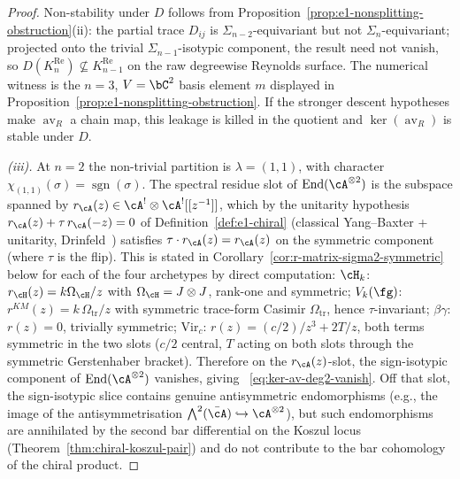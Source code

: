 \begin{proof}
Non-stability under $D$ follows from
Proposition~\ref{prop:e1-nonsplitting-obstruction}(ii): the partial
trace $D_{ij}$ is $\Sigma_{n-2}$-equivariant but not
$\Sigma_n$-equivariant; projected onto the trivial
$\Sigma_{n-1}$-isotypic component, the result need not vanish, so
\(D(K^{\mathrm{Re}}_n)\not\subseteq K^{\mathrm{Re}}_{n-1}\) on the
raw degreewise Reynolds surface. The numerical witness is the
$n=3$, $V=\bC^2$ basis element $m$ displayed in
Proposition~\ref{prop:e1-nonsplitting-obstruction}. If the
stronger descent hypotheses make \(\operatorname{av}_R\) a chain map,
this leakage is killed in the quotient and
\(\ker(\operatorname{av}_R)\) is stable under \(D\).

\emph{(iii).} At $n=2$ the non-trivial partition is $\lambda=(1,1)$,
with character $\chi_{(1,1)}(\sigma)=\operatorname{sgn}(\sigma)$.
The spectral residue slot of $\operatorname{End}(\cA^{\otimes 2})$
is the subspace spanned by $r_\cA(z)\in\cA^{!}\otimes\cA^{!}[[z^{-1}]]$,
which by the unitarity hypothesis
$r_\cA(z)+\tau\,r_\cA(-z)=0$ of
Definition~\textup{\ref{def:e1-chiral}} (classical
Yang--Baxter + unitarity, Drinfeld~\cite{Drinfeld90}) satisfies
$\tau\cdot r_\cA(z)=r_\cA(z)$ on the symmetric component (where
$\tau$ is the flip). This is stated in
Corollary~\ref{cor:r-matrix-sigma2-symmetric} below for each of
the four archetypes by direct computation:
$\cH_k$: $r_{\cH}(z)=k\Omega_{\cH}/z$ with
$\Omega_{\cH}=J\otimes J$, rank-one and symmetric;
$V_k(\fg)$: $r^{KM}(z)=k\,\Omega_{\mathrm{tr}}/z$ with symmetric
trace-form Casimir $\Omega_{\mathrm{tr}}$, hence $\tau$-invariant;
$\beta\gamma$: $r(z)=0$, trivially symmetric;
$\mathrm{Vir}_c$: $r(z)=(c/2)/z^3+2T/z$, both terms symmetric in the
two slots ($c/2$ central, $T$ acting on both slots through the
symmetric Gerstenhaber bracket). Therefore on the
$r_\cA(z)$-slot, the sign-isotypic component of
$\operatorname{End}(\cA^{\otimes 2})$ vanishes, giving~%
\eqref{eq:ker-av-deg2-vanish}. Off that slot, the sign-isotypic
slice contains genuine antisymmetric endomorphisms (e.g., the image
of the antisymmetrisation $\bigwedge^2(\bar\cA)\hookrightarrow
\cA^{\otimes 2}$), but such endomorphisms are annihilated by the
second bar differential on the Koszul locus
\textup{(}Theorem~\textup{\ref{thm:chiral-koszul-pair}}\textup{)}
and do not contribute to the bar cohomology of the chiral product.


\end{proof}
